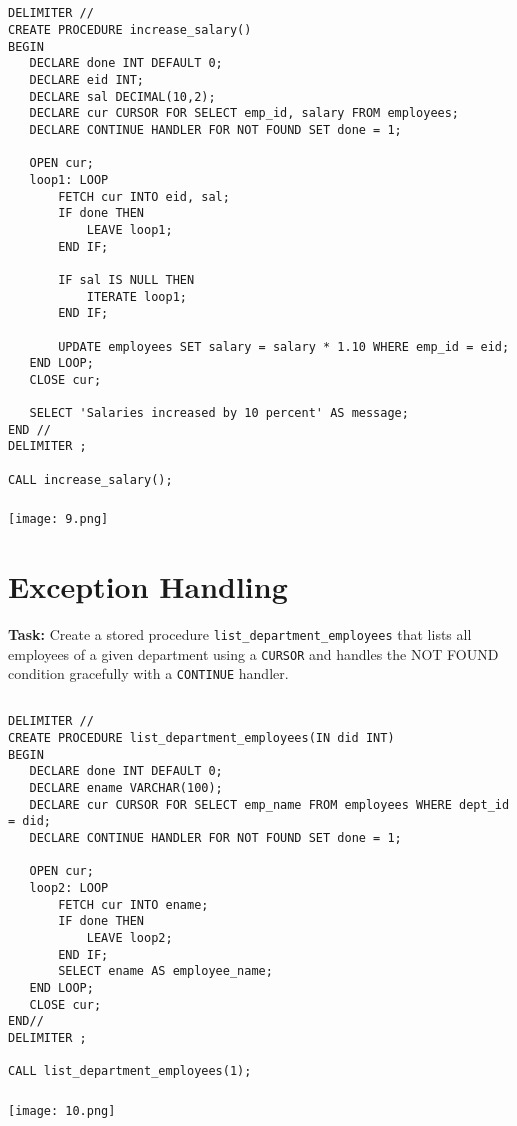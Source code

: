 \documentclass[12pt, a4paper]{article}
\begin{document}
\subsection{}
\begin{lstlisting}
DELIMITER //
CREATE PROCEDURE increase_salary()
BEGIN
   DECLARE done INT DEFAULT 0;
   DECLARE eid INT;
   DECLARE sal DECIMAL(10,2);
   DECLARE cur CURSOR FOR SELECT emp_id, salary FROM employees;
   DECLARE CONTINUE HANDLER FOR NOT FOUND SET done = 1;

   OPEN cur;
   loop1: LOOP
       FETCH cur INTO eid, sal;
       IF done THEN
           LEAVE loop1;
       END IF;

       IF sal IS NULL THEN
           ITERATE loop1;
       END IF;

       UPDATE employees SET salary = salary * 1.10 WHERE emp_id = eid;
   END LOOP;
   CLOSE cur;

   SELECT 'Salaries increased by 10 percent' AS message;
END //
DELIMITER ;

CALL increase_salary();

\end{lstlisting}

\subsubsection{}
\begin{center}
    \texttt{[image: 9.png]}
\end{center}

\section{Exception Handling}
\textbf{Task:} Create a stored procedure \texttt{list\_department\_employees} that lists all employees 
of a given department using a \texttt{CURSOR} and handles the NOT FOUND condition 
gracefully with a \texttt{CONTINUE} handler.

\subsection{}
\begin{lstlisting}
DELIMITER //
CREATE PROCEDURE list_department_employees(IN did INT)
BEGIN
   DECLARE done INT DEFAULT 0;
   DECLARE ename VARCHAR(100);
   DECLARE cur CURSOR FOR SELECT emp_name FROM employees WHERE dept_id = did;
   DECLARE CONTINUE HANDLER FOR NOT FOUND SET done = 1;

   OPEN cur;
   loop2: LOOP
       FETCH cur INTO ename;
       IF done THEN
           LEAVE loop2;
       END IF;
       SELECT ename AS employee_name;
   END LOOP;
   CLOSE cur;
END//
DELIMITER ;

CALL list_department_employees(1);

\end{lstlisting}

\subsubsection{}
\begin{center}
    \texttt{[image: 10.png]}
\end{center}
\end{document}
